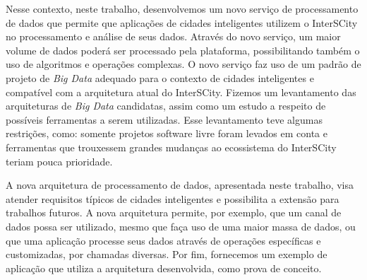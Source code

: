 Nesse contexto, neste trabalho, desenvolvemos um novo serviço de processamento de dados que
permite que aplicações de cidades inteligentes utilizem o InterSCity no processamento e
análise de seus dados. Através do novo serviço,
um maior volume de dados poderá ser processado pela plataforma, possibilitando
também o uso de algoritmos e operações complexas. O novo serviço
faz uso de um padrão de projeto de \textit{Big Data} adequado para o contexto
de cidades inteligentes e compatível com a arquitetura atual do InterSCity.
Fizemos um levantamento das arquiteturas de \textit{Big Data} candidatas, assim
como um estudo a respeito de possíveis ferramentas a serem utilizadas. Esse
levantamento teve algumas restrições, como: somente projetos software livre
foram levados em conta e ferramentas que trouxessem grandes mudanças ao
ecossistema do InterSCity teriam pouca prioridade.

A nova arquitetura de processamento de dados, apresentada neste trabalho, visa
atender requisitos típicos de cidades inteligentes e possibilita a extensão
para trabalhos futuros. A nova arquitetura permite, por exemplo, que um
canal de dados possa ser utilizado, mesmo que faça uso de uma
maior massa de dados, ou que uma aplicação processe seus dados através de
operações específicas e customizadas, por chamadas diversas. 
Por fim, fornecemos um exemplo de aplicação que utiliza a arquitetura
desenvolvida, como prova de conceito.
